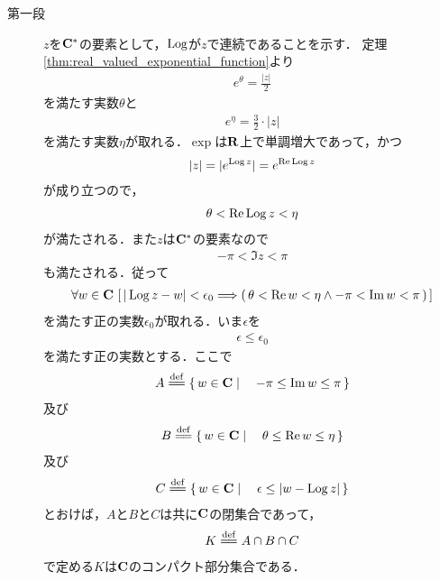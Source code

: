 	\begin{sketch}\mbox{}
		\begin{description}
			\item[第一段]
				$z$を$\mathbf{C}^*$の要素として，$\operatorname{Log}$が$z$で連続であることを示す．
				定理\ref{thm:real_valued_exponential_function}より
				\begin{align}
					e^{\theta} = \frac{|z|}{2}
				\end{align}
				を満たす実数$\theta$と
				\begin{align}
					e^{\eta} = \frac{3}{2} \cdot |z|
				\end{align}
				を満たす実数$\eta$が取れる．$\exp$は$\mathbf{R}$上で単調増大であって，かつ
				\begin{align}
					|z| = |e^{\operatorname{Log}{z}}| = e^{\operatorname{Re} \operatorname{Log}{z}}
				\end{align}
				が成り立つので，
				\begin{align}
					\theta < \operatorname{Re} \operatorname{Log}{z} < \eta
				\end{align}
				が満たされる．また$z$は$\mathbf{C}^*$の要素なので
				\begin{align}
					-\pi < \Im{z} < \pi
				\end{align}
				も満たされる．従って
				\begin{align}
					\forall w \in \mathbf{C}\,
					\left[\, |\operatorname{Log}{z} - w| < \epsilon_0
					\Longrightarrow \left(\, \theta < \operatorname{Re} w < \eta
					\wedge -\pi < \operatorname{Im} w < \pi\, \right)\, \right]
				\end{align}
				を満たす正の実数$\epsilon_0$が取れる．いま$\epsilon$を
				\begin{align}
					\epsilon \leq \epsilon_0
				\end{align}
				を満たす正の実数とする．ここで
				\begin{align}
					A \defeq \Set{w \in \C}{-\pi \leq \Im{w} \leq \pi}
				\end{align}
				及び
				\begin{align}
					B \defeq \Set{w \in \C}{\theta \leq \Re{w} \leq \eta}
				\end{align}
				及び
				\begin{align}
					C \defeq \Set{w \in \C}{\epsilon \leq |w - \pvlog{z}|}
				\end{align}
				とおけば，$A$と$B$と$C$は共に$\mathbf{C}$の閉集合であって，
				\begin{align}
					K \defeq A \cap B \cap C
				\end{align}
				で定める$K$は$\mathbf{C}$のコンパクト部分集合である．
				\begin{align}

\end{align}
\end{description}
\end{sketch}
